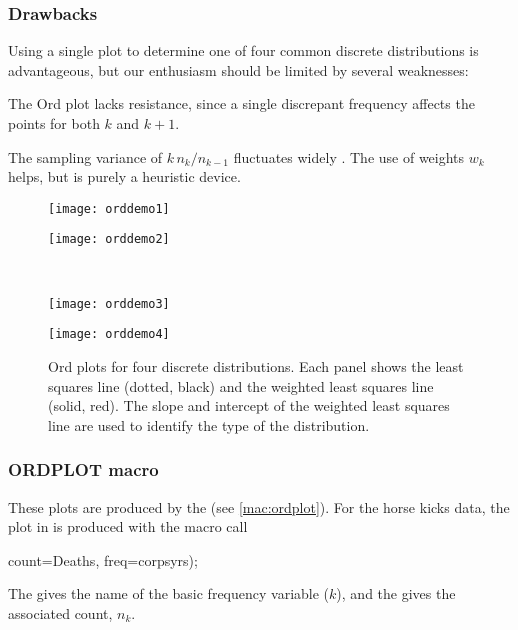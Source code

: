 \subsubsection{Drawbacks}
Using a single plot to determine one of four common discrete
distributions is advantageous, but our enthusiasm should be
limited by several weaknesses:

\begin{itemize*}
\item The Ord plot lacks resistance, since a single discrepant
       frequency affects the points for both \(k\) and \(k  +  1\).

\item The sampling variance of \(k \,  n_k /  n_{k-1}\) fluctuates
       widely
       \citep{HoaglinTukey:85,JinkinsonSlater:81}.  The use of weights \(w_k\) helps, but is purely a
       heuristic device.
\end{itemize*}


\begin{figure}[htb]
 \begin{minipage}[b]{.5\linewidth}
  \centering
  \texttt{[image: orddemo1]}
 \end{minipage}%
 \begin{minipage}[b]{.5\linewidth}
  \centering
  \texttt{[image: orddemo2]}
 \end{minipage}
 \\[3ex]
 \begin{minipage}[b]{.5\linewidth}
  \centering
  \texttt{[image: orddemo3]}
 \end{minipage}%
 \begin{minipage}[b]{.5\linewidth}
  \centering
  \texttt{[image: orddemo4]}
 \end{minipage}
 \caption[Ord plots for four discrete distributions]{Ord plots for four discrete
distributions.  Each panel shows the least squares line (dotted, black) and the weighted least squares line (solid, red). The slope and intercept of the weighted least squares line are used to
identify the type of the distribution.}\label{fig:orddemo}
\end{figure}

\subsubsection{ORDPLOT macro}
These plots are produced by the  (see \ref{mac:ordplot}).  For the horse kicks
data,  the plot in  is produced with the macro call
\begin{listing}
         count=Deaths, freq=corpsyrs);
\end{listing}
The  gives the name of the basic frequency variable ($k$),
and the  gives the associated count, $n_k$.
